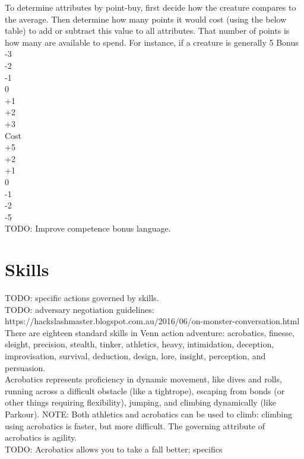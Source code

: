 \documentclass[letterpaper,titlepage,openany,twocolumn]{book}
\begin{document}
To determine attributes by point-buy, first decide how the creature compares to the average. Then determine how many points it would cost (using the below table) to add or subtract this value to all attributes. That number of points is how many are available to spend. For instance, if a creature is generally 5%
Bonus\\
-3\\
-2\\
-1\\
0\\
+1\\
+2\\
+3\\
Cost\\
+5\\
+2\\
+1\\
0\\
-1\\
-2\\
-5\\
TODO: Improve competence bonus language.\\

\section{Skills}
TODO: specific actions governed by skills.\\
TODO: adversary negotiation guidelines: https://hackslashmaster.blogspot.com.au/2016/06/on-monster-conversation.html\\

There are eighteen standard skills in Venn action adventure: acrobatics, finesse, sleight, precision, stealth, tinker, athletics, heavy, intimidation, deception, improvisation, survival, deduction, design, lore, insight, perception, and persuasion.\\

Acrobatics represents proficiency in dynamic movement, like dives and rolls, running across a difficult obstacle (like a tightrope), escaping from bonds (or other things requiring flexibility), jumping, and climbing dynamically (like Parkour). NOTE: Both athletics and acrobatics can be used to climb: climbing using acrobatics is faster, but more difficult. The governing attribute of acrobatics is agility.\\
TODO: Acrobatics allows you to take a fall better; specifics\\
\end{document}
